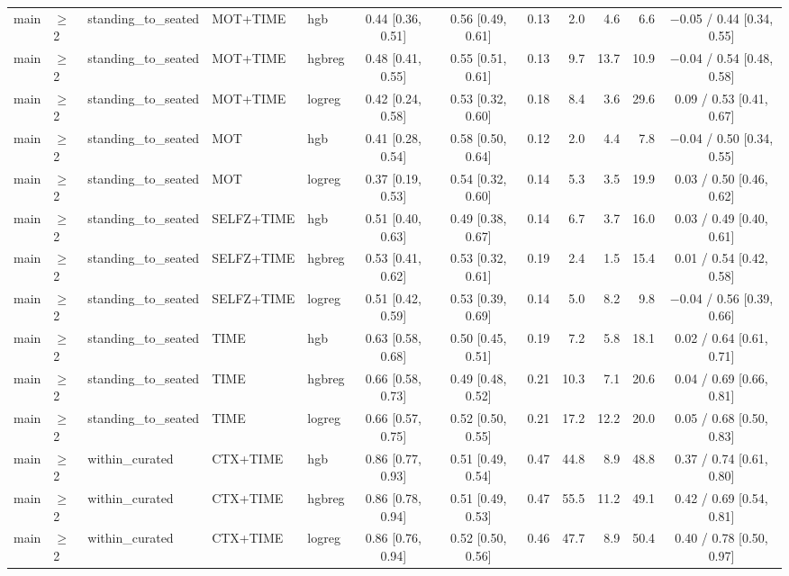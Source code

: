 \begin{longtable}{@{}lllllcccrrrc@{}}
main & $\geq$2 & standing\_to\_seated & MOT+TIME & hgb & 0.44 [0.36, 0.51] & 0.56 [0.49, 0.61] & 0.13 & 2.0 & 4.6 & 6.6 & $-$0.05 / 0.44 [0.34, 0.55] \\
main & $\geq$2 & standing\_to\_seated & MOT+TIME & hgbreg & 0.48 [0.41, 0.55] & 0.55 [0.51, 0.61] & 0.13 & 9.7 & 13.7 & 10.9 & $-$0.04 / 0.54 [0.48, 0.58] \\
main & $\geq$2 & standing\_to\_seated & MOT+TIME & logreg & 0.42 [0.24, 0.58] & 0.53 [0.32, 0.60] & 0.18 & 8.4 & 3.6 & 29.6 & 0.09 / 0.53 [0.41, 0.67] \\
main & $\geq$2 & standing\_to\_seated & MOT & hgb & 0.41 [0.28, 0.54] & 0.58 [0.50, 0.64] & 0.12 & 2.0 & 4.4 & 7.8 & $-$0.04 / 0.50 [0.34, 0.55] \\
main & $\geq$2 & standing\_to\_seated & MOT & logreg & 0.37 [0.19, 0.53] & 0.54 [0.32, 0.60] & 0.14 & 5.3 & 3.5 & 19.9 & 0.03 / 0.50 [0.46, 0.62] \\
main & $\geq$2 & standing\_to\_seated & SELFZ+TIME & hgb & 0.51 [0.40, 0.63] & 0.49 [0.38, 0.67] & 0.14 & 6.7 & 3.7 & 16.0 & 0.03 / 0.49 [0.40, 0.61] \\
main & $\geq$2 & standing\_to\_seated & SELFZ+TIME & hgbreg & 0.53 [0.41, 0.62] & 0.53 [0.32, 0.61] & 0.19 & 2.4 & 1.5 & 15.4 & 0.01 / 0.54 [0.42, 0.58] \\
main & $\geq$2 & standing\_to\_seated & SELFZ+TIME & logreg & 0.51 [0.42, 0.59] & 0.53 [0.39, 0.69] & 0.14 & 5.0 & 8.2 & 9.8 & $-$0.04 / 0.56 [0.39, 0.66] \\
main & $\geq$2 & standing\_to\_seated & TIME & hgb & 0.63 [0.58, 0.68] & 0.50 [0.45, 0.51] & 0.19 & 7.2 & 5.8 & 18.1 & 0.02 / 0.64 [0.61, 0.71] \\
main & $\geq$2 & standing\_to\_seated & TIME & hgbreg & 0.66 [0.58, 0.73] & 0.49 [0.48, 0.52] & 0.21 & 10.3 & 7.1 & 20.6 & 0.04 / 0.69 [0.66, 0.81] \\
main & $\geq$2 & standing\_to\_seated & TIME & logreg & 0.66 [0.57, 0.75] & 0.52 [0.50, 0.55] & 0.21 & 17.2 & 12.2 & 20.0 & 0.05 / 0.68 [0.50, 0.83] \\
main & $\geq$2 & within\_curated & CTX+TIME & hgb & 0.86 [0.77, 0.93] & 0.51 [0.49, 0.54] & 0.47 & 44.8 & 8.9 & 48.8 & 0.37 / 0.74 [0.61, 0.80] \\
main & $\geq$2 & within\_curated & CTX+TIME & hgbreg & 0.86 [0.78, 0.94] & 0.51 [0.49, 0.53] & 0.47 & 55.5 & 11.2 & 49.1 & 0.42 / 0.69 [0.54, 0.81] \\
main & $\geq$2 & within\_curated & CTX+TIME & logreg & 0.86 [0.76, 0.94] & 0.52 [0.50, 0.56] & 0.46 & 47.7 & 8.9 & 50.4 & 0.40 / 0.78 [0.50, 0.97] \\

\end{longtable}
